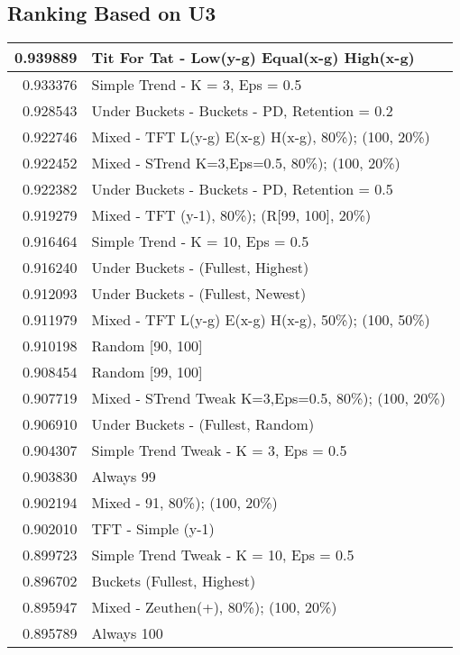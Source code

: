 \begin{table}[!hbtp]
\subsection{Ranking Based on U3}
\begin{footnotesize}
\begin{tabular}{|r|l|}\hline  \label{U3results}
0.939889 & Tit For Tat - Low(y-g) Equal(x-g) High(x-g)\\ \hline
0.933376 & Simple Trend - K = 3, Eps = 0.5\\ \hline
0.928543 & Under Buckets - Buckets - PD, Retention = 0.2\\ \hline
0.922746 & Mixed - {TFT L(y-g) E(x-g) H(x-g), 80\%); (100, 20\%)}\\ \hline
0.922452 & Mixed - {STrend K=3,Eps=0.5, 80\%); (100, 20\%)}\\ \hline
0.922382 & Under Buckets - Buckets - PD, Retention = 0.5\\ \hline
0.919279 & Mixed - {TFT (y-1), 80\%); (R[99, 100], 20\%)}\\ \hline
0.916464 & Simple Trend - K = 10, Eps = 0.5\\ \hline
0.916240 & Under Buckets - (Fullest, Highest)\\ \hline
0.912093 & Under Buckets - (Fullest, Newest)\\ \hline
0.911979 & Mixed - {TFT L(y-g) E(x-g) H(x-g), 50\%); (100, 50\%)}\\ \hline
0.910198 & Random [90, 100]\\ \hline
0.908454 & Random [99, 100]\\ \hline
0.907719 & Mixed - {STrend Tweak K=3,Eps=0.5, 80\%); (100, 20\%)}\\ \hline
0.906910 & Under Buckets - (Fullest, Random)\\ \hline
0.904307 & Simple Trend Tweak - K = 3, Eps = 0.5\\ \hline
0.903830 & Always 99\\ \hline
0.902194 & Mixed - {91, 80\%); (100, 20\%)}\\ \hline
0.902010 & TFT - Simple (y-1)\\ \hline
0.899723 & Simple Trend Tweak - K = 10, Eps = 0.5\\ \hline
0.896702 & Buckets (Fullest, Highest)\\ \hline
0.895947 & Mixed - {Zeuthen(+), 80\%); (100, 20\%)}\\ \hline
0.895789 & Always 100\\ \hline

\end{tabular}
\end{footnotesize}
\end{table}
